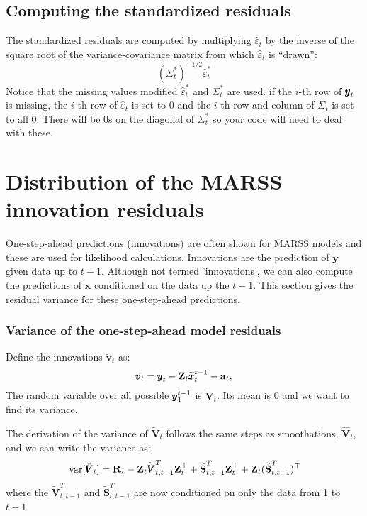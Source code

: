 \documentclass[]{article}
\def\XI{\mbox{\boldmath $\Xi$}}
\def\RR{\mbox{$\mathbf R$}}	 \def\rr{\mbox{$\mathbf r$}} \def\Rb{\mbox{$\mathbf H$}}	\def\Rm{\mathbb{R}}
\def\Ss{\mbox{$\mathbf S$}}
\def\VV{\mbox{$\pmb{V}$}}	\def\vv{\mbox{$\pmb{v}$}}
\def\ZZ{\mbox{$\mathbf Z$}}	\def\zz{\mbox{$\mathbf z$}}	\def\Zb{\mbox{$\mathbf M$}} \def\Za{\mbox{$\mathbf N$}} \def\Zm{\XI}
\def\var{\,\textup{\textrm{var}}}
\def\hatxttm{\widetilde{\xx}_t^{t-1}}
\def\hatVttm{\widetilde{\VV}_{t,t-1}^T}
\def\hatSttm{\widetilde{\Ss}_t^{t-1}}
\def\hatSttm{\widetilde{\Ss}_{t,t-1}^T}
\begin{document}
\subsection{Computing the standardized residuals}
The standardized residuals are computed by multiplying $\hat{\varepsilon}_t$ by the inverse of the square root of the variance-covariance matrix from which $\hat{\varepsilon}_t$ is ``drawn'':
\begin{equation}
(\Sigma_t^*)^{-1/2}\hat{\varepsilon}_t^*
\end{equation}
Notice that the missing values modified $\hat{\varepsilon}_t^*$ and $\Sigma_t^*$ are used. if the $i$-th row of $\mbox{$\pmb{y}$}_t$ is missing, the $i$-th row of $\hat{\varepsilon}_t$ is set to 0 and the $i$-th row and column of $\Sigma_t$ is set to all 0.
There will be 0s on the diagonal of $\Sigma_t^*$ so your code will need to deal with these.

\section{Distribution of the MARSS innovation residuals}

One-step-ahead predictions (innovations) are often shown for MARSS models and these are used for likelihood calculations. Innovations are the prediction of $\mathbf{y}$ given data up to $t-1$. Although not termed 'innovations', we can also compute the predictions of $\mathbf{x}$ conditioned on the data up the $t-1$. This section gives the residual variance for these one-step-ahead predictions. 


\subsubsection{Variance of the one-step-ahead model residuals}

Define the innovations $\tilde{\vv}_t$ as:
\begin{equation}\label{eq:vtT}
\tilde{\vv}_t = \yy_t - \ZZ_t\hatxttm - \aa_t,
\end{equation}
The random variable over all possible $\mbox{$\pmb{y}$}_1^{t-1}$ is $\tilde{\VV}_t$. Its mean is 0 and we want to find its variance.


The derivation of the variance of $\tilde{\VV}_t$ follows the same steps as smoothations, $\hat{\VV}_t$, and we can write the variance as:
\begin{equation}\label{eq:innov.model}
\var[\hat{\VV}_t] = \RR_t - \ZZ_t \hatVttm \ZZ_t^\top + \hatSttm\ZZ_t^\top + \ZZ_t(\hatSttm)^\top
\end{equation}
where the $\hatVttm$ and $\hatSttm$ are now conditioned on only the data from 1 to $t-1$.
\end{document}
